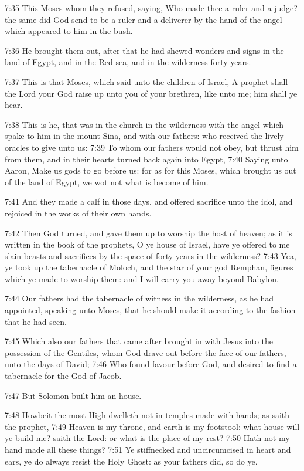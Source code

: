 7:35 This Moses whom they refused, saying, Who made thee a ruler and a judge? the same did God send to be a ruler and a deliverer by the hand of the angel which appeared to him in the bush.

7:36 He brought them out, after that he had shewed wonders and signs in the land of Egypt, and in the Red sea, and in the wilderness forty years.

7:37 This is that Moses, which said unto the children of Israel, A prophet shall the Lord your God raise up unto you of your brethren, like unto me; him shall ye hear.

7:38 This is he, that was in the church in the wilderness with the angel which spake to him in the mount Sina, and with our fathers: who received the lively oracles to give unto us: 7:39 To whom our fathers would not obey, but thrust him from them, and in their hearts turned back again into Egypt, 7:40 Saying unto Aaron, Make us gods to go before us: for as for this Moses, which brought us out of the land of Egypt, we wot not what is become of him.

7:41 And they made a calf in those days, and offered sacrifice unto the idol, and rejoiced in the works of their own hands.

7:42 Then God turned, and gave them up to worship the host of heaven; as it is written in the book of the prophets, O ye house of Israel, have ye offered to me slain beasts and sacrifices by the space of forty years in the wilderness?  7:43 Yea, ye took up the tabernacle of Moloch, and the star of your god Remphan, figures which ye made to worship them: and I will carry you away beyond Babylon.

7:44 Our fathers had the tabernacle of witness in the wilderness, as he had appointed, speaking unto Moses, that he should make it according to the fashion that he had seen.

7:45 Which also our fathers that came after brought in with Jesus into the possession of the Gentiles, whom God drave out before the face of our fathers, unto the days of David; 7:46 Who found favour before God, and desired to find a tabernacle for the God of Jacob.

7:47 But Solomon built him an house.

7:48 Howbeit the most High dwelleth not in temples made with hands; as saith the prophet, 7:49 Heaven is my throne, and earth is my footstool: what house will ye build me? saith the Lord: or what is the place of my rest?  7:50 Hath not my hand made all these things?  7:51 Ye stiffnecked and uncircumcised in heart and ears, ye do always resist the Holy Ghost: as your fathers did, so do ye.

